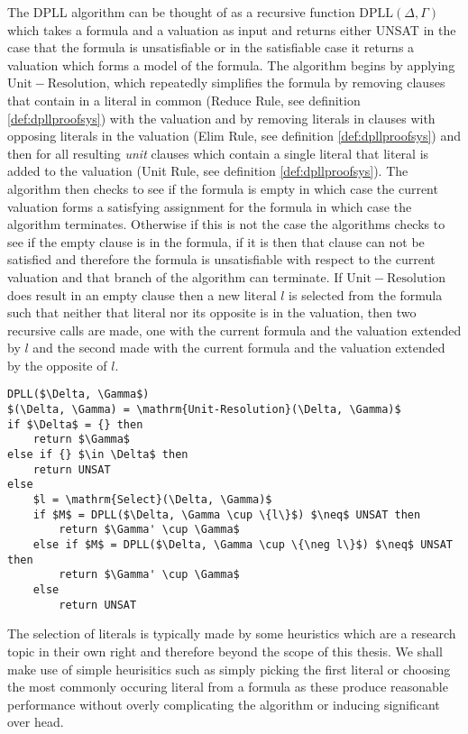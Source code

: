 The DPLL algorithm can be thought of as a recursive function $\mathrm{DPLL}(\Delta,\Gamma)$ which takes a formula and a valuation as input and returns either UNSAT in the case that the formula is unsatisfiable or in the satisfiable case it returns a valuation which forms a model of the formula.  The algorithm begins by applying $\mathrm{Unit-Resolution}$, which repeatedly simplifies the formula by removing clauses that contain in a literal in common (Reduce Rule, see definition \ref{def:dpllproofsys}) with the valuation and by removing literals in clauses with opposing literals in the valuation (Elim Rule, see definition \ref{def:dpllproofsys}) and then for all resulting \emph{unit} clauses which contain a single literal that literal is added to the valuation (Unit Rule, see definition \ref{def:dpllproofsys}).  The algorithm then checks to see if the formula is empty in which case the current valuation forms a satisfying assignment for the formula in which case the algorithm terminates.  Otherwise if this is not the case the algorithms checks to see if the empty clause is in the formula, if it is then that clause can not be satisfied and therefore the formula is unsatisfiable with respect to the current valuation and that branch of the algorithm can terminate. If $\mathrm{Unit-Resolution}$ does result in an empty clause then a new literal $l$ is selected from the formula such that neither that literal nor its opposite is in the valuation, then two recursive calls are made, one with the current formula and the valuation extended by $l$ and the second made with the current formula and the valuation extended by the opposite of $l$. 

\begin{lstlisting}[caption = Example DPLL Algorithm,mathescape]
DPLL($\Delta, \Gamma$)
$(\Delta, \Gamma) = \mathrm{Unit-Resolution}(\Delta, \Gamma)$
if $\Delta$ = {} then
	return $\Gamma$
else if {} $\in \Delta$ then
	return UNSAT
else
	$l = \mathrm{Select}(\Delta, \Gamma)$
	if $M$ = DPLL($\Delta, \Gamma \cup \{l\}$) $\neq$ UNSAT then
		return $\Gamma' \cup \Gamma$ 
	else if $M$ = DPLL($\Delta, \Gamma \cup \{\neg l\}$) $\neq$ UNSAT then 
		return $\Gamma' \cup \Gamma$ 
	else
		return UNSAT
\end{lstlisting}

The selection of literals is typically made by some heuristics which are a research topic in their own right and therefore beyond the scope of this thesis. We shall make use of simple heurisitics such as simply picking the first literal  or choosing the most commonly occuring literal  from a formula as these produce reasonable performance without overly complicating the algorithm or inducing significant over head.

